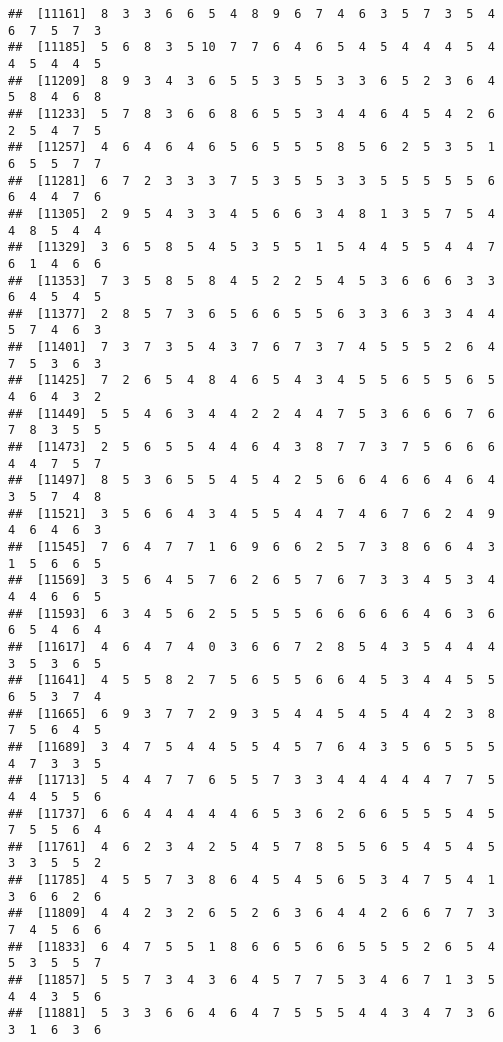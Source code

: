 \documentclass[
]{book}
\begin{document}
\begin{verbatim}
##  [11161]  8  3  3  6  6  5  4  8  9  6  7  4  6  3  5  7  3  5  4  6  7  5  7  3
##  [11185]  5  6  8  3  5 10  7  7  6  4  6  5  4  5  4  4  4  5  4  4  5  4  4  5
##  [11209]  8  9  3  4  3  6  5  5  3  5  5  3  3  6  5  2  3  6  4  5  8  4  6  8
##  [11233]  5  7  8  3  6  6  8  6  5  5  3  4  4  6  4  5  4  2  6  2  5  4  7  5
##  [11257]  4  6  4  6  4  6  5  6  5  5  5  8  5  6  2  5  3  5  1  6  5  5  7  7
##  [11281]  6  7  2  3  3  3  7  5  3  5  5  3  3  5  5  5  5  5  6  6  4  4  7  6
##  [11305]  2  9  5  4  3  3  4  5  6  6  3  4  8  1  3  5  7  5  4  4  8  5  4  4
##  [11329]  3  6  5  8  5  4  5  3  5  5  1  5  4  4  5  5  4  4  7  6  1  4  6  6
##  [11353]  7  3  5  8  5  8  4  5  2  2  5  4  5  3  6  6  6  3  3  6  4  5  4  5
##  [11377]  2  8  5  7  3  6  5  6  6  5  5  6  3  3  6  3  3  4  4  5  7  4  6  3
##  [11401]  7  3  7  3  5  4  3  7  6  7  3  7  4  5  5  5  2  6  4  7  5  3  6  3
##  [11425]  7  2  6  5  4  8  4  6  5  4  3  4  5  5  6  5  5  6  5  4  6  4  3  2
##  [11449]  5  5  4  6  3  4  4  2  2  4  4  7  5  3  6  6  6  7  6  7  8  3  5  5
##  [11473]  2  5  6  5  5  4  4  6  4  3  8  7  7  3  7  5  6  6  6  4  4  7  5  7
##  [11497]  8  5  3  6  5  5  4  5  4  2  5  6  6  4  6  6  4  6  4  3  5  7  4  8
##  [11521]  3  5  6  6  4  3  4  5  5  4  4  7  4  6  7  6  2  4  9  4  6  4  6  3
##  [11545]  7  6  4  7  7  1  6  9  6  6  2  5  7  3  8  6  6  4  3  1  5  6  6  5
##  [11569]  3  5  6  4  5  7  6  2  6  5  7  6  7  3  3  4  5  3  4  4  4  6  6  5
##  [11593]  6  3  4  5  6  2  5  5  5  5  6  6  6  6  6  4  6  3  6  6  5  4  6  4
##  [11617]  4  6  4  7  4  0  3  6  6  7  2  8  5  4  3  5  4  4  4  3  5  3  6  5
##  [11641]  4  5  5  8  2  7  5  6  5  5  6  6  4  5  3  4  4  5  5  6  5  3  7  4
##  [11665]  6  9  3  7  7  2  9  3  5  4  4  5  4  5  4  4  2  3  8  7  5  6  4  5
##  [11689]  3  4  7  5  4  4  5  5  4  5  7  6  4  3  5  6  5  5  5  4  7  3  3  5
##  [11713]  5  4  4  7  7  6  5  5  7  3  3  4  4  4  4  4  7  7  5  4  4  5  5  6
##  [11737]  6  6  4  4  4  4  4  6  5  3  6  2  6  6  5  5  5  4  5  7  5  5  6  4
##  [11761]  4  6  2  3  4  2  5  4  5  7  8  5  5  6  5  4  5  4  5  3  3  5  5  2
##  [11785]  4  5  5  7  3  8  6  4  5  4  5  6  5  3  4  7  5  4  1  3  6  6  2  6
##  [11809]  4  4  2  3  2  6  5  2  6  3  6  4  4  2  6  6  7  7  3  7  4  5  6  6
##  [11833]  6  4  7  5  5  1  8  6  6  5  6  6  5  5  5  2  6  5  4  5  3  5  5  7
##  [11857]  5  5  7  3  4  3  6  4  5  7  7  5  3  4  6  7  1  3  5  4  4  3  5  6
##  [11881]  5  3  3  6  6  4  6  4  7  5  5  5  4  4  3  4  7  3  6  3  1  6  3  6

\end{verbatim}
\end{document}
